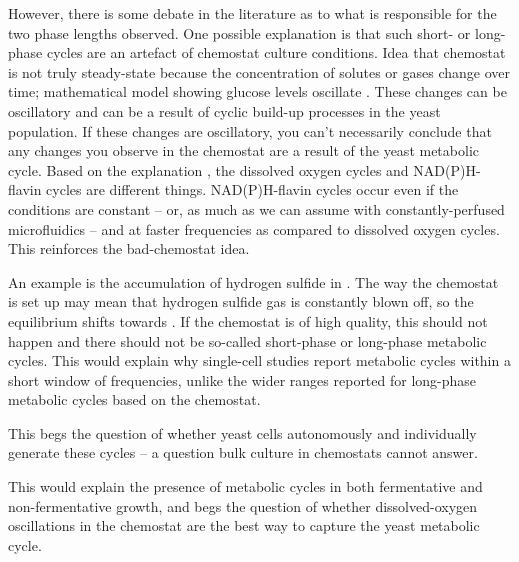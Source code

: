 However, there is some debate in the literature as to what is responsible for the two phase lengths observed.
One possible explanation is that such short- or long-phase cycles are an artefact of chemostat culture conditions.
Idea that chemostat is not truly steady-state because the concentration of solutes or gases change over time; mathematical model showing glucose levels oscillate \citep{jonesCyberneticModelGrowth1999}.
These changes can be oscillatory and can be a result of cyclic build-up processes in the yeast population.
If these changes are oscillatory, you can't necessarily conclude that any changes you observe in the chemostat are a result of the yeast metabolic cycle.
Based on the explanation \citep{jonesCyberneticModelGrowth1999}, the dissolved oxygen cycles and NAD(P)H-flavin cycles are different things.
NAD(P)H-flavin cycles occur even if the conditions are constant -- or, as much as we can assume with constantly-perfused microfluidics -- and at faster frequencies as compared to dissolved oxygen cycles.
This reinforces the bad-chemostat idea.

An example is the accumulation of hydrogen sulfide in \citep{oneillEukaryoticCellBiology2020}.
The way the chemostat is set up may mean that hydrogen sulfide gas is constantly blown off, so the equilibrium shifts towards .
If the chemostat is of high quality, this should not happen and there should not be so-called short-phase or long-phase metabolic cycles.
This would explain why single-cell studies report metabolic cycles within a short window of frequencies, unlike the wider ranges reported for long-phase metabolic cycles based on the chemostat.

This begs the question of whether yeast cells autonomously and individually generate these cycles -- a question bulk culture in chemostats cannot answer.

This would explain the presence of metabolic cycles in both fermentative and non-fermentative growth, and begs the question of whether dissolved-oxygen oscillations in the chemostat are the best way to capture the yeast metabolic cycle.

